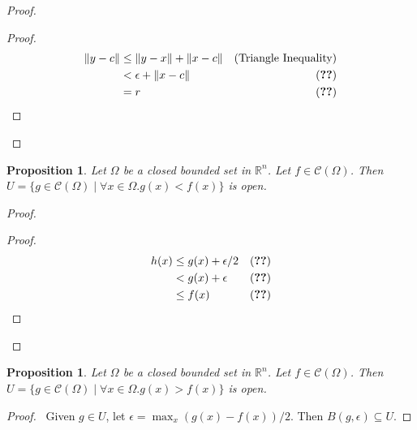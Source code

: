 \documentclass{book}
\let\qed\relax
\newtheorem{prop}[ax]{Proposition}
\theoremstyle{definition}
\begin{document}
\begin{proof}
\pf
{}
\begin{proof}
	\pf
	\begin{align*}
		\|y-c\| & \leq \|y-x\| + \|x-c\| & (\text{Triangle Inequality}) \\
		& < \epsilon + \|x-c\| & (\text{\stepref{5}}) \\
		& = r & (\text{\stepref{4}})
	\end{align*}
\end{proof}
\qed
\end{proof}

\begin{prop}
Let $\Omega$ be a closed bounded set in $\mathbb{R}^n$. Let $f \in \mathcal{C}(\Omega)$. Then $U = \{ g \in \mathcal{C}(\Omega) \mid \forall x \in \Omega. g(x) < f(x) \}$ is open.
\end{prop}

\begin{proof}
\pf
{}
\begin{proof}
	\pf
	\begin{align*}
		h(x) & \leq g(x) + \epsilon/2 & (\text{\stepref{4}}) \\
		& < g(x) + \epsilon & (\text{\stepref{3}}) \\
		& \leq f(x) & (\text{\stepref{2}})
	\end{align*}
\end{proof}
\qed
\end{proof}

\begin{prop}
Let $\Omega$ be a closed bounded set in $\mathbb{R}^n$. Let $f \in \mathcal{C}(\Omega)$. Then $U = \{ g \in \mathcal{C}(\Omega) \mid \forall x \in \Omega. g(x) > f(x) \}$ is open.
\end{prop}

\begin{proof}
\pf\ Given $g \in U$, let $\epsilon = \max_x (g(x) - f(x))/2$. Then $B(g,\epsilon) \subseteq U$. \qed
\end{proof}
\end{document}
